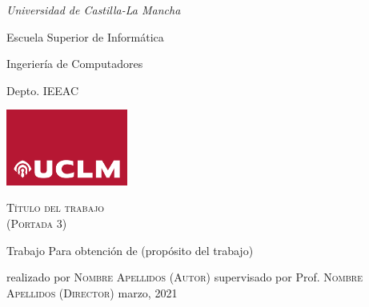 \documentclass[12pt,a4paper]{report}
\begin{document}
\begin{titlepage}
    \noindent\parbox[c]{.5\linewidth}{
    	\linespread{1.3}
    	\itshape Universidad de Castilla-La Mancha\par
    	Escuela Superior de Informática\par
        Ingeriería de Computadores\par
    	Depto. IEEAC\par
    }%
    \parbox[c]{.5\linewidth}{
    	\hfill\includegraphics[width=4cm]{./figs/uclm_logo}
    } 
    \centering
    \par\vspace{.15\textheight}
    {\huge\textsc{Título del trabajo \\
     (Portada 3)}\par}
    \Large
    \par\vspace{.1\textheight}
    Trabajo
    \medbreak
    Para obtención de
    (propósito del trabajo)
    \par\vspace{.08\textheight}
    realizado por
    \medbreak
    \textsc{Nombre Apellidos (Autor)}
    \bigbreak
    supervisado por
    \medbreak
    Prof. \textsc{Nombre Apellidos (Director)}
    \vfill
    \noindent%
    \small \hfill marzo, 2021 
\end{titlepage}
\end{document}
